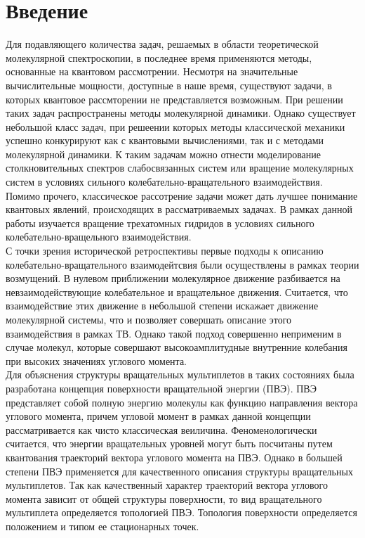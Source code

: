 \section{Введение}

Для подавляющего количества задач, решаемых в области теоретической молекулярной спектроскопии, в последнее время применяются методы, основанные на квантовом рассмотрении. Несмотря на значительные вычислительные мощности, доступные в наше время, существуют задачи, в которых квантовое рассмторении не представляется возможным. При решении таких задач распространены методы молекулярной динамики. Однако существует небольшой класс задач, при решеении которых методы классической механики успешно конкурируют как с квантовыми вычислениями, так и с методами молекулярной динамики. К таким задачам можно отнести моделирование столкновительных спектров слабосвязанных систем или вращение молекулярных систем в условиях сильного колебательно-вращательного взаимодействия. Помимо прочего, классическое рассотрение задачи может дать лучшее понимание квантовых явлений, происходящих в рассматриваемых задачах. В рамках данной работы изучается вращение трехатомных гидридов в условиях сильного колебательно-вращельного взаимодействия.  \\
С точки зрения исторической ретроспективы первые подходы к описанию колебательно-вращательного взаимодейтсвия были осуществлены в рамках теории возмущений. В нулевом приближении молекулярное движение разбивается на невзаимодействующие колебательное и вращательное движения. Считается, что взаимодействие этих движение в небольшой степени искажает движение молекулярной системы, что и позволяет совершать описание этого взаимодействия в рамках ТВ. Однако такой подход совершенно неприменим в случае молекул, которые совершают высокоамплитудные внутренние колебания при высоких значениях углового момента. \\
Для объяснения структуры вращательных мультиплетов в таких состояниях была разработана концепция поверхности вращательной энергии (ПВЭ). ПВЭ представляет собой полную энергию молекулы как функцию направления вектора углового момента, причем угловой момент в рамках данной концепции рассматривается как чисто классическая веиличина. Феноменологически считается, что энергии вращательных уровней могут быть посчитаны путем квантования траекторий вектора углового момента на ПВЭ. Однако в большей степени ПВЭ применяется для качественного описания структуры вращательных мультиплетов. Так как качественный характер траекторий вектора углового момента зависит от общей структуры поверхности, то вид вращательного мультиплета определяется топологией ПВЭ. Топология поверхности определяется положением и типом ее стационарных точек. 
